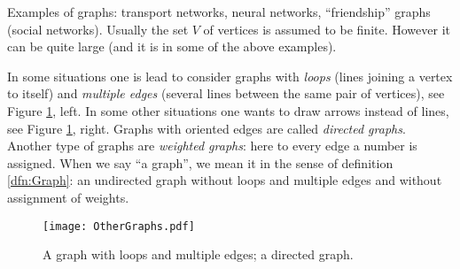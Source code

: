 

\setcounter{section}{1}
\setcounter{subsection}{2}
\setcounter{dfn}{1}


Examples of graphs: transport networks, neural networks, ``friendship'' graphs (social networks).
Usually the set $V$ of vertices is assumed to be finite.
However it can be quite large (and it is in some of the above examples).

In some situations one is lead to consider graphs with \emph{loops} (lines joining a vertex to itself)
and \emph{multiple edges} (several lines between the same pair of vertices), see Figure \ref{fig:OtherGraphs}, left.
In some other situations one wants to draw arrows instead of lines, see Figure \ref{fig:OtherGraphs}, right.
Graphs with oriented edges are called \emph{directed graphs}.
Another type of graphs are \emph{weighted graphs}: here to every edge a number is assigned.
When we say ``a graph'', we mean it in the sense of definition \ref{dfn:Graph}: an undirected graph without loops and multiple edges
and without assignment of weights.

\begin{figure}[ht]
\begin{center}
\texttt{[image: OtherGraphs.pdf]}
\end{center}
\caption{A graph with loops and multiple edges; a directed graph.}
\label{fig:OtherGraphs}
\end{figure}



